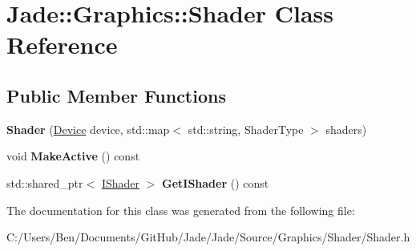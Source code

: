 \hypertarget{class_jade_1_1_graphics_1_1_shader}{}\section{Jade\+:\+:Graphics\+:\+:Shader Class Reference}
\label{class_jade_1_1_graphics_1_1_shader}
\subsection*{Public Member Functions}
\begin{DoxyCompactItemize}
\item 
\hypertarget{class_jade_1_1_graphics_1_1_shader_a6ba8cfe295f29771b8b56590ff39181b}{}{\bfseries Shader} (\hyperlink{class_jade_1_1_graphics_1_1_device}{Device} device, std\+::map$<$ std\+::string, Shader\+Type $>$ shaders)\label{class_jade_1_1_graphics_1_1_shader_a6ba8cfe295f29771b8b56590ff39181b}

\item 
\hypertarget{class_jade_1_1_graphics_1_1_shader_a7de10bfe0767cec145a2a3b30b0b2d0d}{}void {\bfseries Make\+Active} () const \label{class_jade_1_1_graphics_1_1_shader_a7de10bfe0767cec145a2a3b30b0b2d0d}

\item 
\hypertarget{class_jade_1_1_graphics_1_1_shader_ad40483131b7c52a71aeee4dccc95df91}{}std\+::shared\+\_\+ptr$<$ \hyperlink{struct_jade_1_1_graphics_1_1_i_shader}{I\+Shader} $>$ {\bfseries Get\+I\+Shader} () const \label{class_jade_1_1_graphics_1_1_shader_ad40483131b7c52a71aeee4dccc95df91}

\end{DoxyCompactItemize}


The documentation for this class was generated from the following file\+:\begin{DoxyCompactItemize}
\item 
C\+:/\+Users/\+Ben/\+Documents/\+Git\+Hub/\+Jade/\+Jade/\+Source/\+Graphics/\+Shader/Shader.\+h\end{DoxyCompactItemize}
